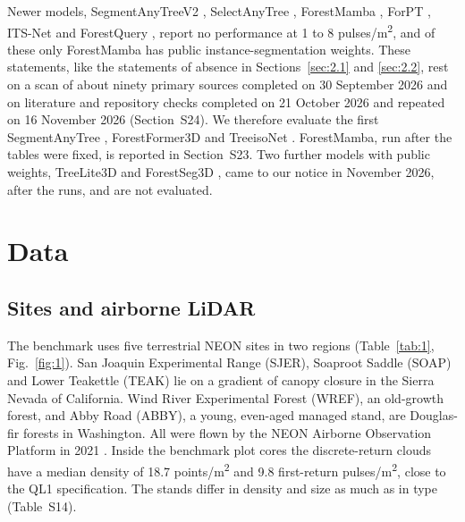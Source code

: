 \documentclass[preprint,12pt,authoryear,a4paper]{elsarticle}
\begin{document}
Newer models, SegmentAnyTreeV2 \citep{wielgosz2026segmentanytreev2}, SelectAnyTree
\citep{nguyen2026selectanytree}, ForestMamba \citep{nguyen2026forestmamba}, ForPT
\citep{yue2026toward}, ITS-Net \citep{li2026itsnet} and ForestQuery
\citep{zhan2026forestquery}, report no performance at 1 to 8 pulses/m\textsuperscript{2}, and of these
only ForestMamba has public instance-segmentation weights. These statements,
like the statements of absence in Sections~\ref{sec:2.1} and \ref{sec:2.2}, rest on a scan of about
ninety primary sources completed on 30 September 2026 and on literature and
repository checks completed on 21 October 2026 and repeated on 16 November 2026
(Section~S24). We therefore evaluate the first SegmentAnyTree
\citep{wielgosz2024segmentanytree}, ForestFormer3D \citep{xiang2025forestformer3d} and
TreeisoNet \citep{xi2025new}. ForestMamba, run after the tables were fixed, is
reported in Section~S23. Two further models with public weights, TreeLite3D
\citep{rizaldy2026labelefficient} and ForestSeg3D \citep{zhang2026forestseg3d}, came to
our notice in November 2026, after the runs, and are not evaluated.

\section{Data}\label{sec:3}

\subsection{Sites and airborne LiDAR}\label{sec:3.1}

The benchmark uses five terrestrial NEON sites in two regions (Table~\ref{tab:1}, Fig.~\ref{fig:1}).
San Joaquin Experimental Range (SJER), Soaproot Saddle (SOAP) and Lower
Teakettle (TEAK) lie on a gradient of canopy closure in the Sierra Nevada of
California. Wind River Experimental Forest (WREF), an old-growth forest, and
Abby Road (ABBY), a young, even-aged managed stand, are Douglas-fir forests in
Washington. All were flown by the NEON Airborne Observation Platform in 2021
\citep{neon2026discrete}. Inside the benchmark plot cores the discrete-return clouds
have a median density of 18.7 points/m\textsuperscript{2} and 9.8 first-return pulses/m\textsuperscript{2}, close to
the QL1 specification. The stands differ in density and size as much as in type
(Table~S14).
\end{document}
